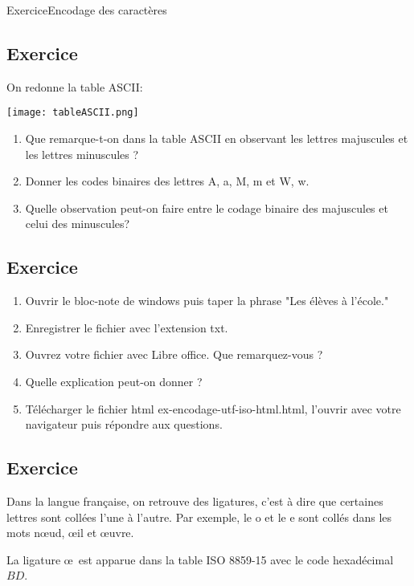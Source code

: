 \documentclass[11pt,a4paper]{article}
\newcounter{numexo}
\begin{document}
\begin{NSI}
{Exercice}{Encodage des caractères}
\end{NSI}


\addtocounter{numexo}{1}
\subsection*{\Large Exercice \thenumexo }
On redonne la table ASCII:
\begin{center}
\texttt{[image: tableASCII.png]}
\end{center}
\begin{enumerate}
\item Que remarque-t-on dans la table ASCII en observant les lettres majuscules et les lettres minuscules ?
\item Donner les codes binaires des lettres A, a, M, m et W, w.
\item Quelle observation peut-on faire entre le codage binaire des majuscules et celui des minuscules?
\end{enumerate}

\addtocounter{numexo}{1}
\subsection*{\Large Exercice \thenumexo }
\begin{enumerate}
\item Ouvrir le bloc-note de windows puis taper la phrase "Les élèves à l'école."
\item Enregistrer le fichier avec l'extension txt.
\item Ouvrez votre fichier avec Libre office. Que remarquez-vous ?
\item Quelle explication peut-on donner ?
\item Télécharger le fichier html ex-encodage-utf-iso-html.html, l'ouvrir avec votre navigateur puis répondre aux questions.
\end{enumerate}


\addtocounter{numexo}{1}
\subsection*{\Large Exercice \thenumexo }
Dans la langue française, on retrouve des ligatures, c'est à dire que certaines lettres sont collées l'une à l'autre. Par exemple, le o et le e sont collés dans les mots n{\oe}ud, {\oe}il et {\oe}uvre.

La ligature \oe ~est apparue dans la table ISO 8859-15 avec le code hexadécimal $BD$.
\end{document}
